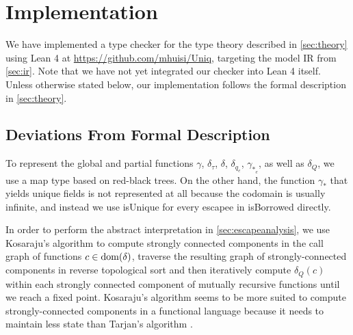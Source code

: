 \chapter{Implementation}\label{sec:implementation}

We have implemented a type checker for the type theory described in \cref{sec:theory} using Lean 4 at \url{https://github.com/mhuisi/Uniq}, targeting the model IR from \cref{sec:ir}. Note that we have not yet integrated our checker into Lean 4 itself. Unless otherwise stated below, our implementation follows the formal description in \cref{sec:theory}.

\section{Deviations From Formal Description}

To represent the global and partial functions $\gamma$, $\delta_\tau$, $\delta$, $\delta_{q_e}$, $\gamma_{*_e}$, as well as $\delta_Q$, we use a map type based on red-black trees. On the other hand, the function $\gamma_*$ that yields unique fields is not represented at all because the codomain is usually infinite, and instead we use isUnique for every escapee in isBorrowed directly.

In order to perform the abstract interpretation in \cref{sec:escapeanalysis}, we use Kosaraju's algorithm \citep{sharir_strong-connectivity_1981} to compute strongly connected components in the call graph of functions $c \in \mathrm{dom}(\delta)$, traverse the resulting graph of strongly-connected components in reverse topological sort and then iteratively compute $\delta_Q(c)$ within each strongly connected component of mutually recursive functions until we reach a fixed point. Kosaraju's algorithm seems to be more suited to compute strongly-connected components in a functional language because it needs to maintain less state than Tarjan's algorithm \citep{tarjan_depth-first_1972}.

